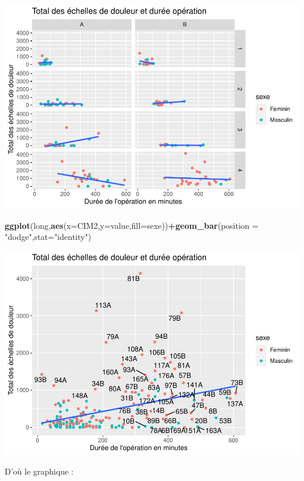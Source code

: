 \documentclass[
]{book}
\newenvironment{Shaded}{\begin{snugshade}}{\end{snugshade}}
\newcommand{\AttributeTok}[1]{\textcolor[rgb]{0.13,0.29,0.53}{#1}}
\newcommand{\FunctionTok}[1]{\textcolor[rgb]{0.13,0.29,0.53}{\textbf{#1}}}
\newcommand{\NormalTok}[1]{#1}
\newcommand{\SpecialCharTok}[1]{\textcolor[rgb]{0.81,0.36,0.00}{\textbf{#1}}}
\newcommand{\StringTok}[1]{\textcolor[rgb]{0.31,0.60,0.02}{#1}}
\begin{document}
\includegraphics{_main_files/figure-latex/ggplot20-1.pdf}

\begin{Shaded}
\begin{Highlighting}[]
\FunctionTok{ggplot}\NormalTok{(long,}\FunctionTok{aes}\NormalTok{(}\AttributeTok{x=}\NormalTok{CIM2,}\AttributeTok{y=}\NormalTok{value,}\AttributeTok{fill=}\NormalTok{sexe))}\SpecialCharTok{+}\FunctionTok{geom\_bar}\NormalTok{(}\AttributeTok{position =} \StringTok{"dodge"}\NormalTok{,}\AttributeTok{stat=}\StringTok{"identity"}\NormalTok{)}
\end{Highlighting}
\end{Shaded}

\includegraphics{_main_files/figure-latex/ggplot21-1.pdf}

D'où le graphique :
\end{document}
